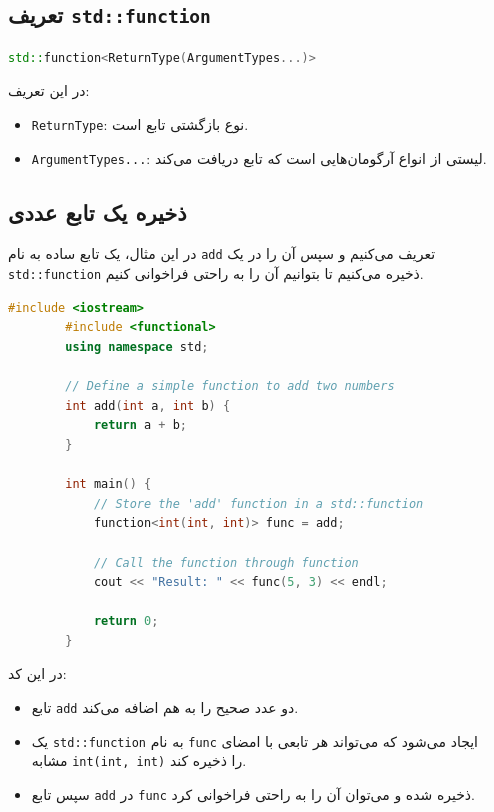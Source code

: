 \documentclass[12pt, a4paper]{report}
\begin{document}
\subsection{تعریف \texttt{std::function}}


\begin{LTR}
	\begin{lstlisting}[language=C++, breaklines=true]
		std::function<ReturnType(ArgumentTypes...)>
	\end{lstlisting}
\end{LTR}

در این تعریف:
\begin{itemize}
	\item \texttt{ReturnType}: نوع بازگشتی تابع است.
	\item \texttt{ArgumentTypes...}: لیستی از انواع آرگومان‌هایی است که تابع دریافت می‌کند.
\end{itemize}

\subsection{ذخیره یک تابع عددی}

در این مثال، یک تابع ساده به نام \texttt{add} تعریف می‌کنیم و سپس آن را در یک \texttt{std::function} ذخیره می‌کنیم تا بتوانیم آن را به راحتی فراخوانی کنیم.

\begin{LTR}
	\begin{lstlisting}[language=C++, breaklines=true]
		#include <iostream>
		#include <functional>
		using namespace std;
		
		// Define a simple function to add two numbers
		int add(int a, int b) {
			return a + b;
		}
		
		int main() {
			// Store the 'add' function in a std::function
			function<int(int, int)> func = add;
			
			// Call the function through function
			cout << "Result: " << func(5, 3) << endl;
			
			return 0;
		}
	\end{lstlisting}
\end{LTR}

در این کد:
\begin{itemize}
	\item تابع \texttt{add} دو عدد صحیح را به هم اضافه می‌کند.
	\item یک \texttt{std::function} به نام \texttt{func} ایجاد می‌شود که می‌تواند هر تابعی با امضای مشابه \texttt{int(int, int)} را ذخیره کند.
	\item سپس تابع \texttt{add} در \texttt{func} ذخیره شده و می‌توان آن را به راحتی فراخوانی کرد.
\end{itemize}
\end{document}
